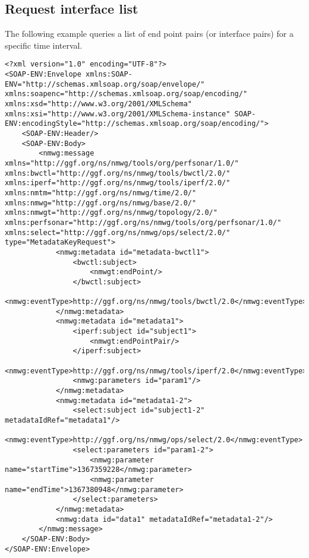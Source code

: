\documentclass[a4paper,12pt,titlepage,hidelinks,fleqn]{article}
\begin{document}
\subsection{Request interface list}
\begin{flushleft}
The following example queries a list of end point pairs (or interface pairs) for a specific time interval.
\begin{framed}
\begin{lstlisting}
<?xml version="1.0" encoding="UTF-8"?>
<SOAP-ENV:Envelope xmlns:SOAP-ENV="http://schemas.xmlsoap.org/soap/envelope/" xmlns:soapenc="http://schemas.xmlsoap.org/soap/encoding/" xmlns:xsd="http://www.w3.org/2001/XMLSchema" xmlns:xsi="http://www.w3.org/2001/XMLSchema-instance" SOAP-ENV:encodingStyle="http://schemas.xmlsoap.org/soap/encoding/">
	<SOAP-ENV:Header/>
	<SOAP-ENV:Body>
		<nmwg:message xmlns="http://ggf.org/ns/nmwg/tools/org/perfsonar/1.0/" xmlns:bwctl="http://ggf.org/ns/nmwg/tools/bwctl/2.0/" xmlns:iperf="http://ggf.org/ns/nmwg/tools/iperf/2.0/" xmlns:nmtm="http://ggf.org/ns/nmwg/time/2.0/" xmlns:nmwg="http://ggf.org/ns/nmwg/base/2.0/" xmlns:nmwgt="http://ggf.org/ns/nmwg/topology/2.0/" xmlns:perfsonar="http://ggf.org/ns/nmwg/tools/org/perfsonar/1.0/" xmlns:select="http://ggf.org/ns/nmwg/ops/select/2.0/" type="MetadataKeyRequest">
			<nmwg:metadata id="metadata-bwctl1">
				<bwctl:subject>
					<nmwgt:endPoint/>
				</bwctl:subject>
				<nmwg:eventType>http://ggf.org/ns/nmwg/tools/bwctl/2.0</nmwg:eventType>
			</nmwg:metadata>
			<nmwg:metadata id="metadata1">
				<iperf:subject id="subject1">
					<nmwgt:endPointPair/>
				</iperf:subject>
				<nmwg:eventType>http://ggf.org/ns/nmwg/tools/iperf/2.0</nmwg:eventType>
				<nmwg:parameters id="param1"/>
			</nmwg:metadata>
			<nmwg:metadata id="metadata1-2">
				<select:subject id="subject1-2" metadataIdRef="metadata1"/>
				<nmwg:eventType>http://ggf.org/ns/nmwg/ops/select/2.0</nmwg:eventType>
				<select:parameters id="param1-2">
					<nmwg:parameter name="startTime">1367359228</nmwg:parameter>
					<nmwg:parameter name="endTime">1367380948</nmwg:parameter>
				</select:parameters>
			</nmwg:metadata>
			<nmwg:data id="data1" metadataIdRef="metadata1-2"/>
		</nmwg:message>
	</SOAP-ENV:Body>
</SOAP-ENV:Envelope>
\end{lstlisting}
\end{framed}
\end{flushleft}
\end{document}
